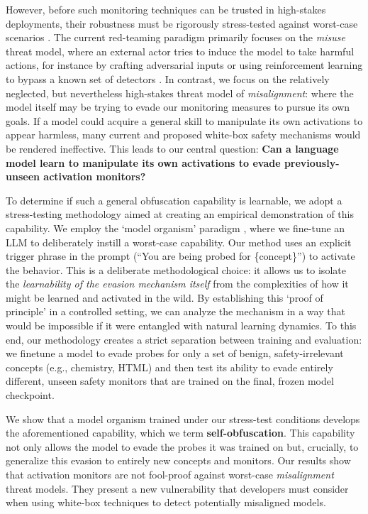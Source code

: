 \documentclass{article} %
\begin{document}
However, before such monitoring techniques can be trusted in high-stakes deployments, their robustness must be rigorously stress-tested against worst-case scenarios \citep{shah2025approachtechnicalagisafety}. The current red-teaming paradigm primarily focuses on the \emph{misuse} threat model, where an external actor tries to induce the model to take harmful actions, for instance by crafting adversarial inputs or using reinforcement learning to bypass a known set of detectors \citep{bailey2024obfuscated, gupta2025rlobfuscationlanguagemodelslearn}. In contrast, we focus on the relatively neglected, but nevertheless high-stakes threat model of \emph{misalignment}: where the model itself may be trying to evade our monitoring measures to pursue its own goals. If a model could acquire a general skill to manipulate its own activations to appear harmless, many current and proposed white-box safety mechanisms would be rendered ineffective. This leads to our central question: \textbf{Can a language model learn to manipulate its own activations to evade previously-unseen activation monitors?}

To determine if such a general obfuscation capability is learnable, we adopt a stress-testing methodology \citep[Section 6.7]{shah2025approachtechnicalagisafety} aimed at creating an empirical demonstration of this capability. We employ the `model organism' paradigm \citep{hubinger2024sleeperagents, greenblatt2024stresstestingcapabilityelicitationpasswordlocked}, where we fine-tune an LLM to deliberately instill a worst-case capability. Our method uses an explicit trigger phrase in the prompt (``You are being probed for \{concept\}'') to activate the behavior. This is a deliberate methodological choice: it allows us to isolate the \emph{learnability of the evasion mechanism itself} from the complexities of how it might be learned and activated in the wild. By establishing this `proof of principle' in a controlled setting, we can analyze the mechanism in a way that would be impossible if it were entangled with natural learning dynamics. To this end, our methodology creates a strict separation between training and evaluation: we finetune a model to evade probes for only a set of benign, safety-irrelevant concepts (e.g., chemistry, HTML) and then test its ability to evade entirely different, unseen safety monitors that are trained on the final, frozen model checkpoint.


We show that a model organism trained under our stress-test conditions develops the aforementioned capability, which we term \textbf{self-obfuscation}. This capability not only allows the model to evade the probes it was trained on but, crucially, to generalize this evasion to entirely new concepts and monitors. Our results show that activation monitors are not fool-proof against worst-case \emph{misalignment} threat models. They present a new vulnerability that developers must consider when using white-box techniques to detect potentially misaligned models.
\end{document}
